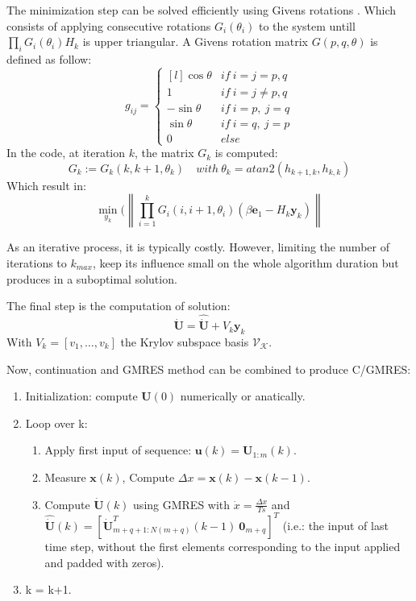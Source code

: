 \documentclass[a4paper, 12pt]{report}
\newcommand\norm[1]{\left\lVert#1\right\rVert}
\begin{document}
The minimization step can be solved efficiently using Givens rotations \cite{Bjorck1996}. Which consists of applying consecutive rotations $G_i(\theta_i)$ to the system untill $\prod_i G_i(\theta_i) H_k$ is upper triangular.
A Givens rotation matrix $G(p, q, \theta)$ is defined  as follow:
\[ g_{ij} = \left\{ \begin{matrix*}[l] \cos{\theta} &  if\ i = j = p, q \\ 1 & if\ i = j \neq p, q  \\  -\sin{\theta} &  if\ i = p,\ j = q \\ \sin{\theta} &  if\ i = q,\ j = p \\ 0 & else \end{matrix*} \right.\]
In the code, at iteration $k$, the matrix $G_k$ is computed:
\[ G_k := G_k(k, k+1, \theta_k) \quad with\ \theta_k = atan2(h_{k+1, k}, h_{k,k})\]
Which result in:
\[ \min\limits_{y_k}(\norm{\prod\limits_{i=1}^k G_i(i, i+1, \theta_i) (\beta \boldsymbol{e}_1 - H_k \boldsymbol{y}_k)} \]

As an iterative process, it is typically costly. However, limiting the number of iterations to $k_{max}$, keep its influence small on the whole algorithm duration but produces in a suboptimal solution.

The final step is the computation of solution:
\[ \boldsymbol{\dot U} = \boldsymbol{\hat{ \dot U}} + V_k \boldsymbol{y}_k \]
With $V_k = [v_1, \ldots, v_k]$ the Krylov subspace basis $\mathcal{V}_\mathcal{K}$.

Now, continuation and GMRES method can be combined to produce C/GMRES:
\begin{enumerate}
\item Initialization: compute $\boldsymbol{U}(0)$ numerically or anatically.
\item Loop over k:
\begin{enumerate}
\item Apply first input of sequence: $\boldsymbol{u}(k) = \boldsymbol{U}_{1:m}(k)$.
\item Measure $\boldsymbol{x}(k)$, Compute $\Delta x = \boldsymbol{x}(k) - \boldsymbol{x}(k-1)$.
\item Compute $\boldsymbol{\dot U}(k)$ using GMRES with $\dot x = \frac{\Delta x}{Ts}$ and $\boldsymbol{\hat{\dot U}}(k) = [\boldsymbol{\dot U}^T_{m+q+1:N(m+q)}(k-1)\ \boldsymbol{0}_{m+q}]^T $ (i.e.: the input of last time step, without the first elements corresponding to the input applied and padded with zeros).
\end{enumerate}
\item k = k+1.
\end{enumerate}
\end{document}
